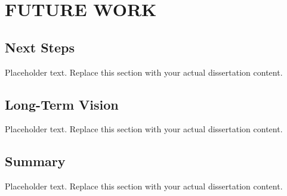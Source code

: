
\chapter{FUTURE WORK}

\section{Next Steps}
Placeholder text. Replace this section with your actual dissertation content.

\section{Long-Term Vision}
Placeholder text. Replace this section with your actual dissertation content.

\section{Summary}
Placeholder text. Replace this section with your actual dissertation content.
